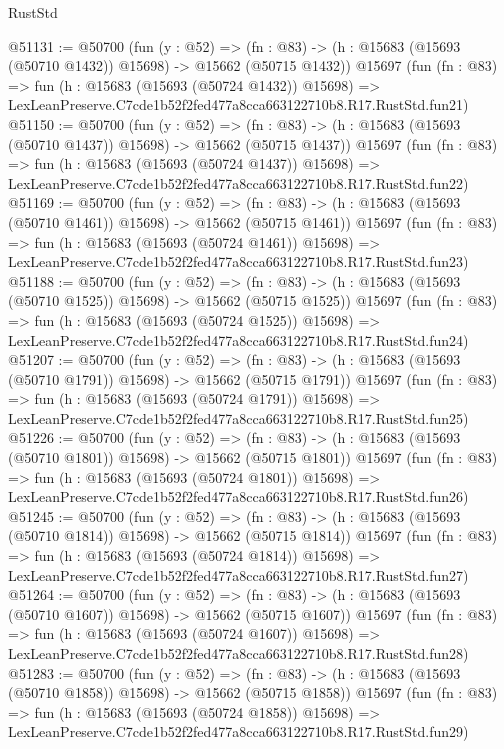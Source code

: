 \begin{lexlean}{RustStd}
\begin{coremodule}
@51131 := @50700
    (fun (y : @52) =>
    (fn : @83) -> (h : @15683 (@15693 (@50710 @1432)) @15698) -> @15662 (@50715 @1432))
    @15697
    (fun (fn : @83) =>
    fun (h : @15683 (@15693 (@50724 @1432)) @15698) =>
    LexLeanPreserve.C7cde1b52f2fed477a8cca663122710b8.R17.RustStd.fun21)
@51150 := @50700
    (fun (y : @52) =>
    (fn : @83) -> (h : @15683 (@15693 (@50710 @1437)) @15698) -> @15662 (@50715 @1437))
    @15697
    (fun (fn : @83) =>
    fun (h : @15683 (@15693 (@50724 @1437)) @15698) =>
    LexLeanPreserve.C7cde1b52f2fed477a8cca663122710b8.R17.RustStd.fun22)
@51169 := @50700
    (fun (y : @52) =>
    (fn : @83) -> (h : @15683 (@15693 (@50710 @1461)) @15698) -> @15662 (@50715 @1461))
    @15697
    (fun (fn : @83) =>
    fun (h : @15683 (@15693 (@50724 @1461)) @15698) =>
    LexLeanPreserve.C7cde1b52f2fed477a8cca663122710b8.R17.RustStd.fun23)
@51188 := @50700
    (fun (y : @52) =>
    (fn : @83) -> (h : @15683 (@15693 (@50710 @1525)) @15698) -> @15662 (@50715 @1525))
    @15697
    (fun (fn : @83) =>
    fun (h : @15683 (@15693 (@50724 @1525)) @15698) =>
    LexLeanPreserve.C7cde1b52f2fed477a8cca663122710b8.R17.RustStd.fun24)
@51207 := @50700
    (fun (y : @52) =>
    (fn : @83) -> (h : @15683 (@15693 (@50710 @1791)) @15698) -> @15662 (@50715 @1791))
    @15697
    (fun (fn : @83) =>
    fun (h : @15683 (@15693 (@50724 @1791)) @15698) =>
    LexLeanPreserve.C7cde1b52f2fed477a8cca663122710b8.R17.RustStd.fun25)
@51226 := @50700
    (fun (y : @52) =>
    (fn : @83) -> (h : @15683 (@15693 (@50710 @1801)) @15698) -> @15662 (@50715 @1801))
    @15697
    (fun (fn : @83) =>
    fun (h : @15683 (@15693 (@50724 @1801)) @15698) =>
    LexLeanPreserve.C7cde1b52f2fed477a8cca663122710b8.R17.RustStd.fun26)
@51245 := @50700
    (fun (y : @52) =>
    (fn : @83) -> (h : @15683 (@15693 (@50710 @1814)) @15698) -> @15662 (@50715 @1814))
    @15697
    (fun (fn : @83) =>
    fun (h : @15683 (@15693 (@50724 @1814)) @15698) =>
    LexLeanPreserve.C7cde1b52f2fed477a8cca663122710b8.R17.RustStd.fun27)
@51264 := @50700
    (fun (y : @52) =>
    (fn : @83) -> (h : @15683 (@15693 (@50710 @1607)) @15698) -> @15662 (@50715 @1607))
    @15697
    (fun (fn : @83) =>
    fun (h : @15683 (@15693 (@50724 @1607)) @15698) =>
    LexLeanPreserve.C7cde1b52f2fed477a8cca663122710b8.R17.RustStd.fun28)
@51283 := @50700
    (fun (y : @52) =>
    (fn : @83) -> (h : @15683 (@15693 (@50710 @1858)) @15698) -> @15662 (@50715 @1858))
    @15697
    (fun (fn : @83) =>
    fun (h : @15683 (@15693 (@50724 @1858)) @15698) =>
    LexLeanPreserve.C7cde1b52f2fed477a8cca663122710b8.R17.RustStd.fun29)

\end{coremodule}
\end{lexlean}
